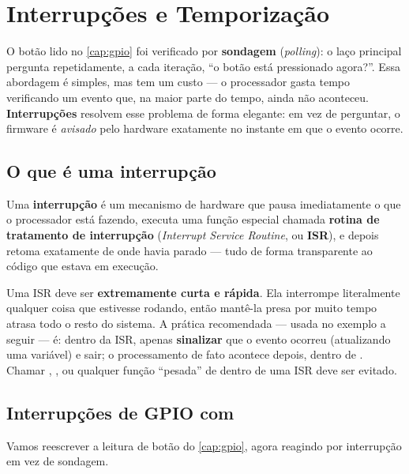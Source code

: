 \chapter{Interrupções e Temporização}
\label{cap:interrupcoes}

O botão lido no \cref{cap:gpio} foi verificado por \textbf{sondagem} (\emph{polling}): o laço principal pergunta repetidamente, a cada iteração, ``o botão está pressionado agora?''. Essa abordagem é simples, mas tem um custo — o processador gasta tempo verificando um evento que, na maior parte do tempo, ainda não aconteceu. \textbf{Interrupções} resolvem esse problema de forma elegante: em vez de perguntar, o firmware é \emph{avisado} pelo hardware exatamente no instante em que o evento ocorre.

\section{O que é uma interrupção}

Uma \textbf{interrupção} é um mecanismo de hardware que pausa imediatamente o que o processador está fazendo, executa uma função especial chamada \textbf{rotina de tratamento de interrupção} (\emph{Interrupt Service Routine}, ou \textbf{ISR}), e depois retoma exatamente de onde havia parado — tudo de forma transparente ao código que estava em execução.

\begin{atencao}
Uma ISR deve ser \textbf{extremamente curta e rápida}. Ela interrompe literalmente qualquer coisa que estivesse rodando, então mantê-la presa por muito tempo atrasa todo o resto do sistema. A prática recomendada — usada no exemplo a seguir — é: dentro da ISR, apenas \textbf{sinalizar} que o evento ocorreu (atualizando uma variável) e sair; o processamento de fato acontece depois, dentro de . Chamar , , ou qualquer função ``pesada'' de dentro de uma ISR deve ser evitado.
\end{atencao}

\section{Interrupções de GPIO com }

Vamos reescrever a leitura de botão do \cref{cap:gpio}, agora reagindo por interrupção em vez de sondagem.

